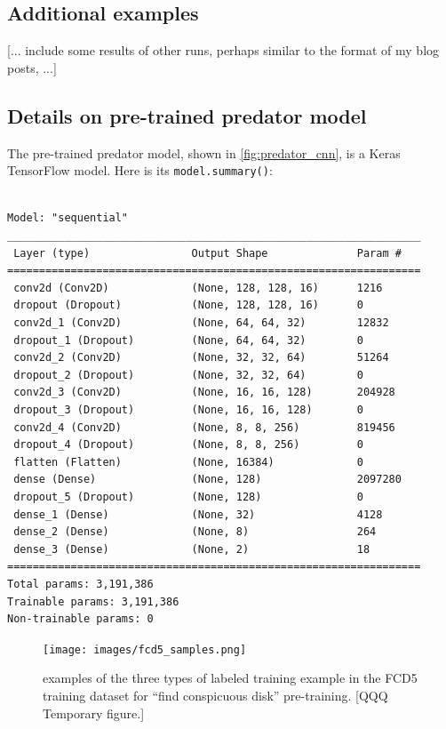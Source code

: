 \documentclass[sigconf]{acmart}
\begin{document}
\subsection{Additional examples}
[... include some results of other runs, perhaps similar to the format of my blog posts,  ...]

\subsection{Details on pre-trained predator model}
The pre-trained predator model, shown in \ref{fig:predator_cnn}, is a Keras TensorFlow model. Here is its \texttt{model.summary()}:
\begin{adjustwidth}{1cm}{0cm}
\begin{small}
\begin{verbatim}

Model: "sequential"
_________________________________________________________________
 Layer (type)                Output Shape              Param #
=================================================================
 conv2d (Conv2D)             (None, 128, 128, 16)      1216
 dropout (Dropout)           (None, 128, 128, 16)      0
 conv2d_1 (Conv2D)           (None, 64, 64, 32)        12832
 dropout_1 (Dropout)         (None, 64, 64, 32)        0
 conv2d_2 (Conv2D)           (None, 32, 32, 64)        51264
 dropout_2 (Dropout)         (None, 32, 32, 64)        0
 conv2d_3 (Conv2D)           (None, 16, 16, 128)       204928
 dropout_3 (Dropout)         (None, 16, 16, 128)       0
 conv2d_4 (Conv2D)           (None, 8, 8, 256)         819456
 dropout_4 (Dropout)         (None, 8, 8, 256)         0
 flatten (Flatten)           (None, 16384)             0
 dense (Dense)               (None, 128)               2097280
 dropout_5 (Dropout)         (None, 128)               0
 dense_1 (Dense)             (None, 32)                4128
 dense_2 (Dense)             (None, 8)                 264
 dense_3 (Dense)             (None, 2)                 18
=================================================================
Total params: 3,191,386
Trainable params: 3,191,386
Non-trainable params: 0
\end{verbatim}
\end{small}
\end{adjustwidth}

\begin{figure}
    \texttt{[image: images/fcd5\_samples.png]}
    \caption{examples of the three types of labeled training example in the FCD5 training dataset for “find conspicuous disk” pre-training.  [QQQ Temporary figure.]}
    \label{fig:fcd5_samples}
\end{figure}

\end{document}
